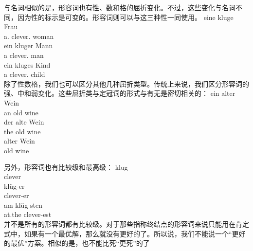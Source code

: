 与名词相似的是，形容词也有性、数和格的屈折变化。不过，这些变化与名词不同，因为性的标示是可变的。形容词则可以与这三种性一同使用。
\eal
\ex 
\gll eine kluge Frau\\
	 a.\fem{} clever.\fem{} woman\\
\ex 
\gll ein kluger Mann\\
	 a clever.\mas{} man\\
\ex 
\gll ein kluges Kind\\
	 a clever.\neu{} child\\
\zl
除了性数格，我们也可以区分其他几种屈折类型。传统上来说，我们区分形容词的强、中和弱变化。这些屈折类与定冠词的形式与有无是密切相关的：
\eal
\ex 
\gll ein alter Wein\\
     an old wine\\
\ex
\gll der alte Wein\\
     the old wine\\
\ex 
\gll alter Wein\\
     old wine\\
\zl


另外，形容词也有比较级和最高级：
\eal
\ex 
\gll klug\\
	 clever\\
\ex 
\gll klüg-er\\
	 clever-er\\
\ex 
\gll am klüg-sten\\
	 at.the clever-est\\
\zl
并不是所有的形容词都有比较级。对于那些指称终结点的形容词来说只能用在肯定式中，如果有一个最优解，那么就没有更好的了。所以说，我们不能说一个“更好的最优”方案。相似的是，也不能比死“更死”的了

